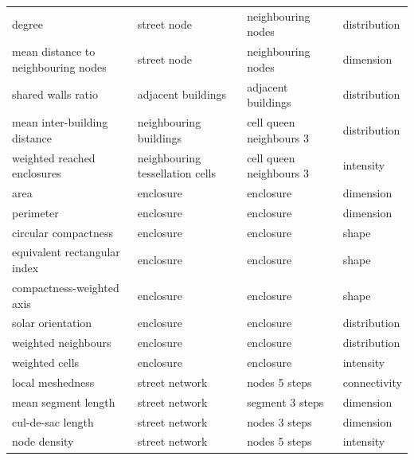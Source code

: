 \begin{longtable}{p{5cm}p{4cm}p{4cm}l}
                              degree &                     street node &         neighbouring nodes & distribution \\
 mean distance to neighbouring nodes &                     street node &         neighbouring nodes &    dimension \\
                  shared walls ratio &             adjacent buildings  &        adjacent buildings  & distribution \\
        mean inter-building distance &          neighbouring buildings &    cell queen neighbours 3 & distribution \\
         weighted reached enclosures & neighbouring tessellation cells &    cell queen neighbours 3 &    intensity \\
                                area &                       enclosure &                  enclosure &    dimension \\
                           perimeter &                       enclosure &                  enclosure &    dimension \\
                circular compactness &                       enclosure &                  enclosure &        shape \\
        equivalent rectangular index &                       enclosure &                  enclosure &        shape \\
           compactness-weighted axis &                       enclosure &                  enclosure &        shape \\
                   solar orientation &                       enclosure &                  enclosure & distribution \\
                 weighted neighbours &                       enclosure &                  enclosure & distribution \\
                      weighted cells &                       enclosure &                  enclosure &    intensity \\
                    local meshedness &                  street network &              nodes 5 steps & connectivity \\
                 mean segment length &                  street network &            segment 3 steps &    dimension \\
                   cul-de-sac length &                  street network &              nodes 3 steps &    dimension \\
                        node density &                  street network &              nodes 5 steps &    intensity \\

\end{longtable}
